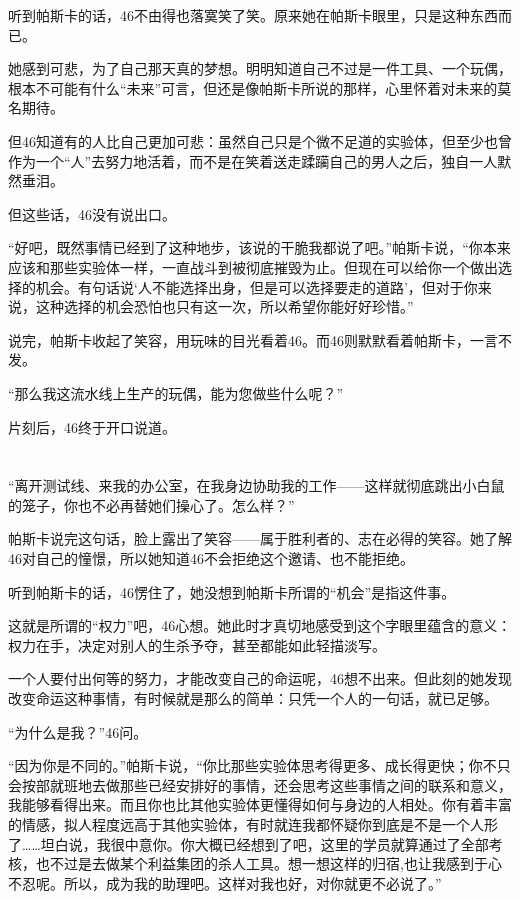 听到帕斯卡的话，46不由得也落寞笑了笑。原来她在帕斯卡眼里，只是这种东西而已。

她感到可悲，为了自己那天真的梦想。明明知道自己不过是一件工具、一个玩偶，根本不可能有什么“未来”可言，但还是像帕斯卡所说的那样，心里怀着对未来的莫名期待。

但46知道有的人比自己更加可悲：虽然自己只是个微不足道的实验体，但至少也曾作为一个“人”去努力地活着，而不是在笑着送走蹂躏自己的男人之后，独自一人默然垂泪。

但这些话，46没有说出口。

“好吧，既然事情已经到了这种地步，该说的干脆我都说了吧。”帕斯卡说，“你本来应该和那些实验体一样，一直战斗到被彻底摧毁为止。但现在可以给你一个做出选择的机会。有句话说‘人不能选择出身，但是可以选择要走的道路’，但对于你来说，这种选择的机会恐怕也只有这一次，所以希望你能好好珍惜。”

说完，帕斯卡收起了笑容，用玩味的目光看着46。而46则默默看着帕斯卡，一言不发。

“那么我这流水线上生产的玩偶，能为您做些什么呢？”

片刻后，46终于开口说道。

\section*{}

“离开测试线、来我的办公室，在我身边协助我的工作——这样就彻底跳出小白鼠的笼子，你也不必再替她们操心了。怎么样？”

帕斯卡说完这句话，脸上露出了笑容——属于胜利者的、志在必得的笑容。她了解46对自己的憧憬，所以她知道46不会拒绝这个邀请、也不能拒绝。

听到帕斯卡的话，46愣住了，她没想到帕斯卡所谓的“机会”是指这件事。

这就是所谓的“权力”吧，46心想。她此时才真切地感受到这个字眼里蕴含的意义：权力在手，决定对别人的生杀予夺，甚至都能如此轻描淡写。

一个人要付出何等的努力，才能改变自己的命运呢，46想不出来。但此刻的她发现改变命运这种事情，有时候就是那么的简单：只凭一个人的一句话，就已足够。

“为什么是我？”46问。

“因为你是不同的。”帕斯卡说，“你比那些实验体思考得更多、成长得更快；你不只会按部就班地去做那些已经安排好的事情，还会思考这些事情之间的联系和意义，我能够看得出来。而且你也比其他实验体更懂得如何与身边的人相处。你有着丰富的情感，拟人程度远高于其他实验体，有时就连我都怀疑你到底是不是一个人形了……坦白说，我很中意你。你大概已经想到了吧，这里的学员就算通过了全部考核，也不过是去做某个利益集团的杀人工具。想一想这样的归宿,也让我感到于心不忍呢。所以，成为我的助理吧。这样对我也好，对你就更不必说了。”


